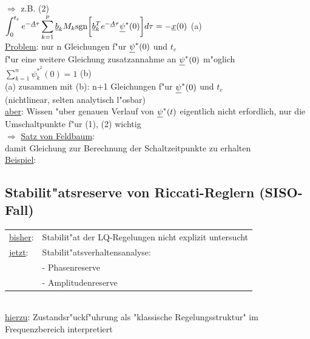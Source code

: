 \documentclass[openany,a4paper,11pt]{book}
\begin{document}
\begin{enumerate}
    $\Rightarrow$ z.B. (2)\\
    $\displaystyle\int_0^{t_e}e^{-\uline{A}\tau}\sum_{k=1}^p\uline{b}_kM_k\text{sgn}\bigg[\uline{b}_k^Te^{-\uline{A}\tau}\uline{\psi}^*(0)\bigg]d\tau=-\uline{x}(0)$ \quad (a)\\
    \uline{Problem}: nur n Gleichungen f"ur $\uline{\psi}^*(0)$ und $t_e$\\
    f"ur eine weitere Gleichung zusatzannahme an $\uline{\psi}^*(0)$ m"oglich\\
    $\displaystyle \sum_{k=1}^n\psi_k^{*^2}(0)=1$ \quad (b)\\
    (a) zusammen mit (b): n+1 Gleichungen f"ur $\uline{\psi}^*(0)$ und $t_e$ \\
    (nichtlinear, selten analytisch l"osbar)\\
    \uline{aber}: Wissen "uber genauen Verlauf von $\uline{\psi}^*(t)$ eigentlich nicht erfordlich, nur die Umschaltpunkte f"ur (1), (2) wichtig 
    \\$\Rightarrow$ \uline{Satz von Feldbaum}: \\
    damit Gleichung zur Berechnung der Schaltzeitpunkte zu erhalten\\
    \uline{Beispiel}:     
\end{enumerate}
\subsection{Stabilit"atsreserve von Riccati-Reglern (SISO-Fall)}
\begin{tabular}{ll}
    \uline{bisher}:& Stabilit"at der LQ-Regelungen nicht explizit untersucht\\
    \uline{jetzt}: & Stabilit"atsverhaltensanalyse:\\
    & - Phasenreserve \\
    & - Amplitudenreserve
\end{tabular}\\
\uline{hierzu}: Zustandsr"uckf"uhrung als "klassische Regelungsstruktur" im Frequenzbereich interpretiert
\end{document}

